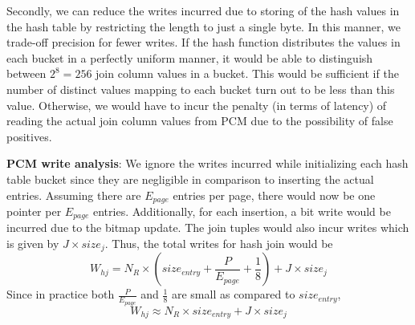 Secondly, we can reduce the writes incurred due to storing of the hash values in
the hash table by restricting the length to just a single byte. In this
manner, we trade-off precision for fewer writes. If the hash function
distributes the values in each bucket in a perfectly uniform manner, it
would be able to distinguish between $2^8 = 256$ join column values in a
bucket. This would be sufficient if the number of distinct values mapping
to each bucket turn out to be less than this value. Otherwise, we would
have to incur the penalty (in terms of latency) of reading the actual join
column values from PCM due to the possibility of false positives.

\textbf{PCM write analysis}: We ignore the writes incurred while initializing each hash table bucket since they are negligible in comparison to inserting the actual entries. Assuming there are $E_{page}$ entries per page, there would now be one pointer per $E_{page}$ entries. Additionally, for each insertion, a bit write would be incurred due to the bitmap update. The join tuples would also incur writes which is given by $J \times size_j$. Thus, the total writes for hash join would be
$$W_{hj} = N_R \times (size_{entry} +  \frac{P}{E_{page}} + \frac{1}{8} ) + J \times size_{j}$$
Since in practice both  $\frac{P}{E_{page}}$ and $\frac{1}{8}$ are small as compared to $size_{entry}$, 
\vspace{-0.05in}
\begin{equation}\label{eq:hj}
 W_{hj} \approx N_R \times size_{entry} + J \times size_{j} 
\end{equation} 
